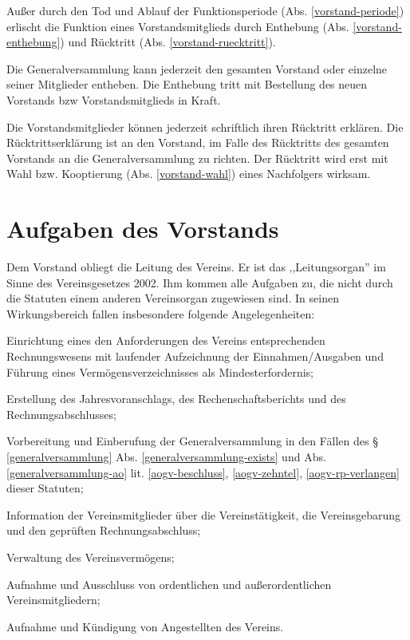 \documentclass{article}
\begin{document}
\begin{absatz}
     \item \label{vorstand-ende} Außer durch den Tod und Ablauf der Funktionsperiode (Abs. \ref{vorstand-periode}) erlischt die Funktion eines Vorstandsmitglieds durch Enthebung (Abs. \ref{vorstand-enthebung}) und Rücktritt (Abs. \ref{vorstand-ruecktritt}). 
     \item \label{vorstand-enthebung} Die Generalversammlung kann jederzeit den gesamten Vorstand oder einzelne seiner Mitglieder entheben. Die Enthebung tritt mit Bestellung des neuen Vorstands bzw Vorstandsmitglieds in Kraft.
     \item \label{vorstand-ruecktritt} Die Vorstandsmitglieder können jederzeit schriftlich ihren Rücktritt erklären. Die Rücktrittserklärung ist  an den Vorstand, im Falle des Rücktritts des gesamten Vorstands an die Generalversammlung zu richten. Der Rücktritt wird erst mit Wahl bzw. Kooptierung (Abs. \ref{vorstand-wahl}) eines Nachfolgers wirksam.
\end{absatz}



\section{Aufgaben des Vorstands}\label{vorstand-aufgaben}
Dem Vorstand obliegt die Leitung des Vereins. Er ist das ,,Leitungsorgan'' im Sinne des Vereinsgesetzes 2002. Ihm kommen alle Aufgaben zu, die nicht durch die Statuten einem anderen Vereinsorgan zugewiesen sind. In seinen Wirkungsbereich fallen insbesondere folgende Angelegenheiten:
\begin{absatz}
    \item Einrichtung eines den Anforderungen des Vereins entsprechenden Rechnungswesens mit laufender Aufzeichnung der Einnahmen/Ausgaben und Führung eines Vermögensverzeichnisses als Mindesterfordernis;
    \item Erstellung des Jahresvoranschlags, des Rechenschaftsberichts und des Rechnungsabschlusses;
    \item Vorbereitung und Einberufung der Generalversammlung in den Fällen des § \ref{generalversammlung} Abs. \ref{generalversammlung-exists} und Abs. \ref{generalversammlung-ao} lit. \ref{aogv-beschluss}, \ref{aogv-zehntel}, \ref{aogv-rp-verlangen} dieser Statuten;
    \item Information der Vereinsmitglieder über die Vereinstätigkeit, die Vereinsgebarung und den geprüften Rechnungsabschluss;
    \item Verwaltung des Vereinsvermögens;
    \item Aufnahme und Ausschluss von ordentlichen und außerordentlichen Vereinsmitgliedern;
    \item Aufnahme und Kündigung von Angestellten des Vereins.
\end{absatz}
\end{document}
